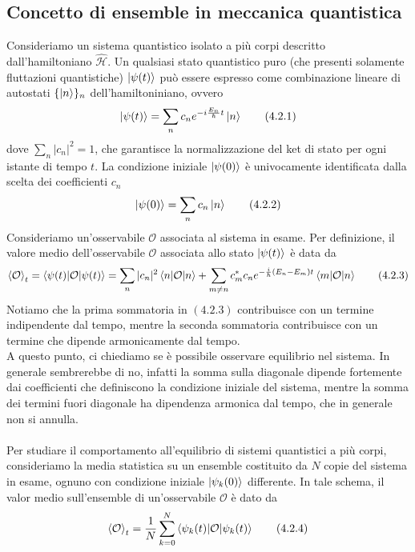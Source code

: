 \documentclass{article}
\begin{document}
\subsection{Concetto di ensemble in meccanica quantistica}
Consideriamo un sistema quantistico isolato a più corpi descritto dall'hamiltoniano $\hat{\mathcal{H}}$. Un qualsiasi stato quantistico puro (che presenti solamente fluttazioni quantistiche) $\ket{\psi(t)}$ può essere espresso come combinazione lineare di autostati $\{\ket{n}\}_n$ dell'hamiltoniniano, ovvero 
\begin{align}
    \ket{\psi(t)} = \sum_n c_ne^{-i\frac{E_n}{\hbar}t}\ket{n} \tag{4.2.1}
\end{align}
dove $\sum_n |c_n|^2 = 1$, che garantisce la normalizzazione del ket di stato per ogni istante di tempo $t$. La condizione iniziale $\ket{\psi(0)}$ è univocamente identificata dalla scelta dei coefficienti $c_n$
\begin{align}
    \ket{\psi(0)} = \sum_n c_n\ket{n} \tag{4.2.2}
\end{align}
Consideriamo un'osservabile $\mathcal{O}$ associata al sistema in esame. Per definizione, il valore medio dell'osservabile $\mathcal{O}$ associata allo stato $\ket{\psi(t)}$ è data da 
\begin{align}
    \braket{\mathcal{O}}_t = \braket{\psi(t)|\mathcal{O}|\psi(t)} = \sum_n |c_n|^2\braket{n|\mathcal{O}|n} + \sum_{m \neq n}c_m^*c_ne^{-\frac{i}{\hbar}(E_n - E_m)t}\braket{m|\mathcal{O}|n} \tag{4.2.3}
\end{align}
Notiamo che la prima sommatoria in $(4.2.3)$ contribuisce con un termine indipendente dal tempo, mentre la seconda sommatoria contribuisce con un termine che dipende armonicamente dal tempo. \\
A questo punto, ci chiediamo se è possibile osservare equilibrio nel sistema. In generale sembrerebbe di no, infatti la somma sulla diagonale dipende fortemente dai coefficienti che definiscono la condizione iniziale del sistema, mentre la somma dei termini fuori diagonale ha dipendenza armonica dal tempo, che in generale non si annulla. \\ \\
Per studiare il comportamento all'equilibrio di sistemi quantistici a più corpi, consideriamo la media statistica su un ensemble costituito da $N$ copie del sistema in esame, ognuno con condizione iniziale $\ket{\psi_k(0)}$ differente. In tale schema, il valor medio sull'ensemble di un'osservabile $\mathcal{O}$ è dato da 
\begin{align}
    \braket{\mathcal{O}}_t = \frac{1}{N}\sum_{k = 0}^N \braket{\psi_k(t)|\mathcal{O}|\psi_k(t)} \tag{4.2.4}
\end{align}
\end{document}
